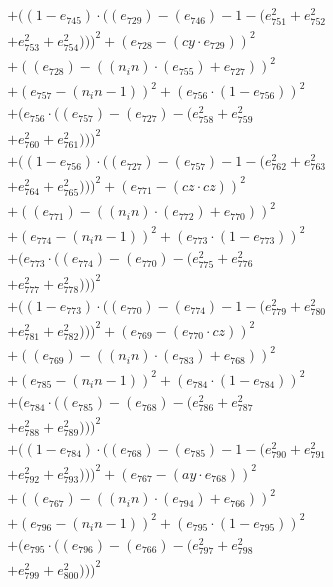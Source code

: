 \documentclass[10pt, a4paper]{article}
\begin{document}
\begin{small}
\begin{align*}
& + ((1 - e_{745})  \cdot  ((e_{729}) - (e_{746}) - 1 - (e_{751}^{2} + e_{752}^{2} \\
& + e_{753}^{2} + e_{754}^{2})))^{2} + (e_{728} - (cy  \cdot  e_{729}))^{2} \\
& + ((e_{728}) - ((n_in)  \cdot  (e_{755}) + e_{727}))^{2} \\
& + (e_{757} - (n_in - 1))^{2} + (e_{756}  \cdot  (1 - e_{756}))^{2} \\
& + (e_{756}  \cdot  ((e_{757}) - (e_{727}) - (e_{758}^{2} + e_{759}^{2} \\
& + e_{760}^{2} + e_{761}^{2})))^{2} \\
& + ((1 - e_{756})  \cdot  ((e_{727}) - (e_{757}) - 1 - (e_{762}^{2} + e_{763}^{2} \\
& + e_{764}^{2} + e_{765}^{2})))^{2} + (e_{771} - (cz  \cdot  cz))^{2} \\
& + ((e_{771}) - ((n_in)  \cdot  (e_{772}) + e_{770}))^{2} \\
& + (e_{774} - (n_in - 1))^{2} + (e_{773}  \cdot  (1 - e_{773}))^{2} \\
& + (e_{773}  \cdot  ((e_{774}) - (e_{770}) - (e_{775}^{2} + e_{776}^{2} \\
& + e_{777}^{2} + e_{778}^{2})))^{2} \\
& + ((1 - e_{773})  \cdot  ((e_{770}) - (e_{774}) - 1 - (e_{779}^{2} + e_{780}^{2} \\
& + e_{781}^{2} + e_{782}^{2})))^{2} + (e_{769} - (e_{770}  \cdot  cz))^{2} \\
& + ((e_{769}) - ((n_in)  \cdot  (e_{783}) + e_{768}))^{2} \\
& + (e_{785} - (n_in - 1))^{2} + (e_{784}  \cdot  (1 - e_{784}))^{2} \\
& + (e_{784}  \cdot  ((e_{785}) - (e_{768}) - (e_{786}^{2} + e_{787}^{2} \\
& + e_{788}^{2} + e_{789}^{2})))^{2} \\
& + ((1 - e_{784})  \cdot  ((e_{768}) - (e_{785}) - 1 - (e_{790}^{2} + e_{791}^{2} \\
& + e_{792}^{2} + e_{793}^{2})))^{2} + (e_{767} - (ay  \cdot  e_{768}))^{2} \\
& + ((e_{767}) - ((n_in)  \cdot  (e_{794}) + e_{766}))^{2} \\
& + (e_{796} - (n_in - 1))^{2} + (e_{795}  \cdot  (1 - e_{795}))^{2} \\
& + (e_{795}  \cdot  ((e_{796}) - (e_{766}) - (e_{797}^{2} + e_{798}^{2} \\
& + e_{799}^{2} + e_{800}^{2})))^{2} \\

\end{align*}
\end{small}
\end{document}
